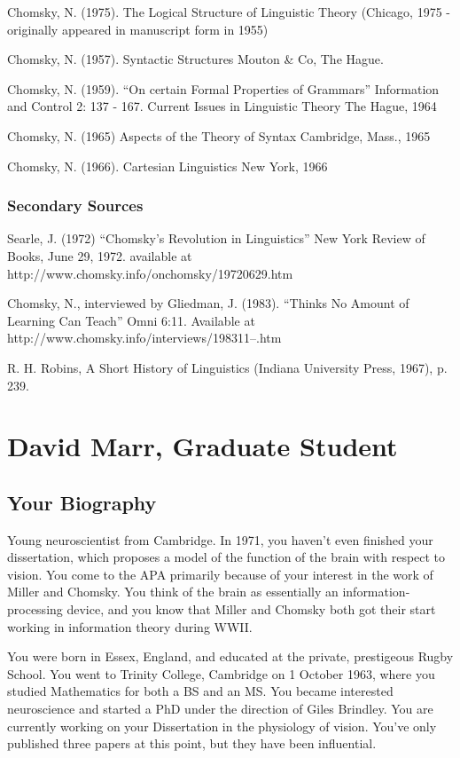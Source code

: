 \begin{refsection}
Chomsky, N. (1975). The Logical Structure of Linguistic Theory (Chicago, 1975 - originally appeared in manuscript form in 1955)

Chomsky, N. (1957). Syntactic Structures Mouton \& Co, The Hague.

Chomsky, N. (1959). ``On certain Formal Properties of Grammars'' Information and Control 2: 137 - 167. Current Issues in Linguistic Theory The Hague, 1964

Chomsky, N. (1965) Aspects of the Theory of Syntax Cambridge, Mass., 1965

Chomsky, N. (1966). Cartesian Linguistics New York, 1966

\subsection{Secondary Sources}
\label{secondarysources}

Searle, J. (1972) ``Chomsky's Revolution in Linguistics'' New York Review of Books, June 29, 1972. available at http:\slash \slash www.chomsky.info\slash onchomsky\slash 19720629.htm

Chomsky, N., interviewed by Gliedman, J. (1983). ``Thinks No Amount of Learning Can Teach'' Omni 6:11. Available at http:\slash \slash www.chomsky.info\slash interviews\slash 198311--.htm

R. H. Robins, A Short History of Linguistics (Indiana University Press, 1967), p. 239.

\chapter{David Marr, Graduate Student}
\label{davidmarrgraduatestudent}

\section{Your Biography}
\label{yourbiography}

Young neuroscientist from Cambridge. In 1971, you haven't even finished your dissertation, which proposes a model of the function of the brain with respect to vision. You come to the APA primarily because of your interest in the work of Miller and Chomsky. You think of the brain as essentially an information-processing device, and you know that Miller and Chomsky both got their start working in information theory during WWII.

You were born in Essex, England, and educated at the private, prestigeous Rugby School. You went to Trinity College, Cambridge on 1 October 1963, where you studied Mathematics for both a BS and an MS. You became interested neuroscience and started a PhD under the direction of Giles Brindley. You are currently working on your Dissertation in the physiology of vision. You've only published three papers at this point, but they have been influential.


\end{refsection}
